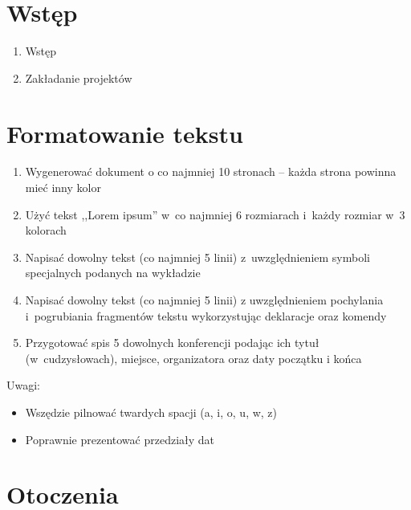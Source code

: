 \documentclass[a4paper,12pt]{article}
\begin{document}
\section{Wstęp}

\begin{enumerate}
    \item Wstęp
    \item Zakładanie projektów
\end{enumerate}

\section{Formatowanie tekstu}

\begin{enumerate}
    \item Wygenerować dokument o co najmniej 10 stronach -- każda strona powinna mieć inny kolor
    \item Użyć tekst ,,Lorem ipsum'' w~co najmniej 6 rozmiarach i~każdy rozmiar w~3 kolorach
    \item Napisać dowolny tekst (co najmniej 5 linii) z~uwzględnieniem symboli specjalnych podanych na wykładzie
    \item Napisać dowolny tekst (co najmniej 5 linii) z uwzględnieniem pochylania i~pogrubiania fragmentów tekstu wykorzystując deklaracje oraz komendy
    \item Przygotować spis 5 dowolnych konferencji podając ich tytuł (w~cudzysłowach), miejsce, organizatora oraz daty początku i końca
\end{enumerate}

Uwagi:

\begin{itemize}
    \item Wszędzie pilnować twardych spacji (a, i, o, u, w, z)
    \item Poprawnie prezentować przedziały dat
\end{itemize}

\section{Otoczenia}
\end{document}
